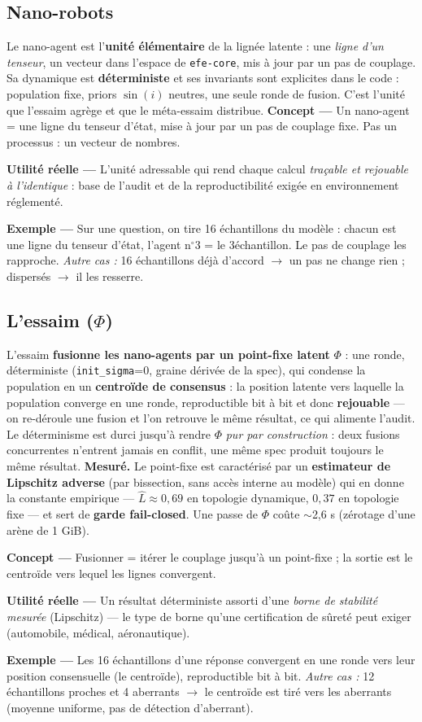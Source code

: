 \documentclass[11pt]{article}
\newcommand{\mesure}[1]{{\color{efeteal}\textbf{Mesuré.} }#1\par}
\newcommand{\concept}[1]{{\color{efenavy}\textbf{Concept —} }#1\par}
\newcommand{\exemple}[1]{{\color{efeamber}\textbf{Exemple —} }#1\par}
\newcommand{\utilite}[1]{{\color{efeplum}\textbf{Utilité réelle —} }#1\par}
\begin{document}
\subsection{Nano-robots}
Le nano-agent est l'\textbf{unité élémentaire} de la lignée latente : une \emph{ligne d'un tenseur}, un
vecteur dans l'espace de \texttt{efe-core}, mis à jour par un pas de couplage. Sa dynamique est
\textbf{déterministe} et ses invariants sont explicites dans le code : population fixe, priors
$\sin(i)$ neutres, une seule ronde de fusion. C'est l'unité que l'essaim agrège et que le méta-essaim distribue.
\concept{Un nano-agent = une ligne du tenseur d'état, mise à jour par un pas de couplage fixe.
Pas un processus : un vecteur de nombres.}
\utilite{L'unité adressable qui rend chaque calcul \emph{traçable et rejouable à l'identique} :
base de l'audit et de la reproductibilité exigée en environnement réglementé.}
\exemple{Sur une question, on tire 16 échantillons du modèle : chacun est une ligne du tenseur
d'état, l'agent n$^\circ$3 = le 3\ieme échantillon. Le pas de couplage les rapproche.
\emph{Autre cas :} 16 échantillons déjà d'accord $\rightarrow$ un pas ne change rien ; dispersés
$\rightarrow$ il les resserre.}

\subsection{L'essaim ($\Phi$)}
L'essaim \textbf{fusionne les nano-agents par un point-fixe latent} $\Phi$ : une ronde,
déterministe (\texttt{init\_sigma}=0, graine dérivée de la spec), qui condense la population en
un \textbf{centroïde de consensus} : la position latente vers laquelle la population converge en
une ronde, reproductible bit à bit et donc \textbf{rejouable} — on re-déroule une fusion et
l'on retrouve le même résultat, ce qui alimente l'audit. Le déterminisme est durci jusqu'à rendre
$\Phi$ \emph{pur par construction} : deux fusions concurrentes n'entrent jamais en conflit, une
même spec produit toujours le même résultat.
\mesure{Le point-fixe est caractérisé par un \textbf{estimateur de Lipschitz adverse} (par
bissection, sans accès interne au modèle) qui en donne la constante empirique —
$\hat{L}\approx0{,}69$ en topologie dynamique, $0{,}37$ en topologie fixe — et sert de
\textbf{garde fail-closed}. Une passe de $\Phi$ coûte $\sim$2,6 s (zérotage d'une arène de
1 GiB).}
\concept{Fusionner = itérer le couplage jusqu'à un point-fixe ; la sortie est le centroïde vers
lequel les lignes convergent.}
\utilite{Un résultat déterministe assorti d'une \emph{borne de stabilité mesurée} (Lipschitz) —
le type de borne qu'une certification de sûreté peut exiger (automobile, médical, aéronautique).}
\exemple{Les 16 échantillons d'une réponse convergent en une ronde vers leur position
consensuelle (le centroïde), reproductible bit à bit. \emph{Autre cas :} 12 échantillons
proches et 4 aberrants $\rightarrow$ le centroïde est tiré vers les aberrants (moyenne uniforme,
pas de détection d'aberrant).}
\end{document}
